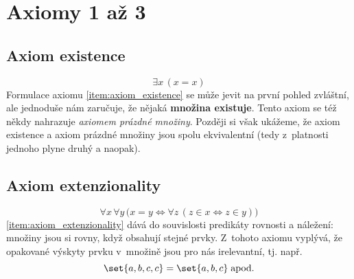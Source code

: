 \section{Axiomy 1 až 3}\label{sec:axiomy_1_az_3}
\subsection{Axiom existence}
\begin{equation*}
    \exists x\,(x=x)
\end{equation*}
Formulace axiomu \ref{item:axiom_existence} se může jevit na první pohled zvláštní, ale jednoduše nám zaručuje, že nějaká \textbf{množina existuje}. Tento axiom se též někdy nahrazuje \emph{axiomem prázdné množiny}. Později si však ukážeme, že axiom existence a axiom prázdné množiny jsou spolu ekvivalentní (tedy z~platnosti jednoho plyne druhý a naopak).

\subsection{Axiom extenzionality}
\begin{equation*}
    \forall x\,\forall y\,\bigl(x=y \iff \forall z\,(z\in x \iff z\in y)\bigr)
\end{equation*}
\ref{item:axiom_extenzionality} dává do souvislosti predikáty rovnosti a náležení: množiny jsou si rovny, když obsahují stejné prvky. Z~tohoto axiomu vyplývá, že opakované výskyty prvku v~množině jsou pro nás irelevantní, tj. např.
\begin{equation*}
    \set{a,b,c,c}=\set{a,b,c}\;\text{apod.}
\end{equation*}

